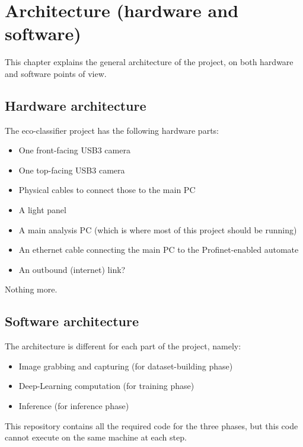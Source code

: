 \chapter{Architecture (hardware and software)}
\label{chapter:architecture}

This chapter explains the general architecture of the project, on both hardware and software points of view.

\section{Hardware architecture}

The eco-classifier project has the following hardware parts:

\begin{itemize}
    \item One front-facing USB3 camera
    \item One top-facing USB3 camera
    \item Physical cables to connect those to the main PC
    \item A light panel
    \item A main analysis PC (which is where most of this project should be running)
    \item An ethernet cable connecting the main PC to the Profinet-enabled automate
    \item An outbound (internet) link?
\end{itemize}

Nothing more.


\section{Software architecture}

The architecture is different for each part of the project, namely:

\begin{itemize}
    \item Image grabbing and capturing (for dataset-building phase)
    \item Deep-Learning computation (for training phase)
    \item Inference (for inference phase)
\end{itemize}

This repository contains all the required code for the three phases, but this code cannot execute
on the same machine at each step.


